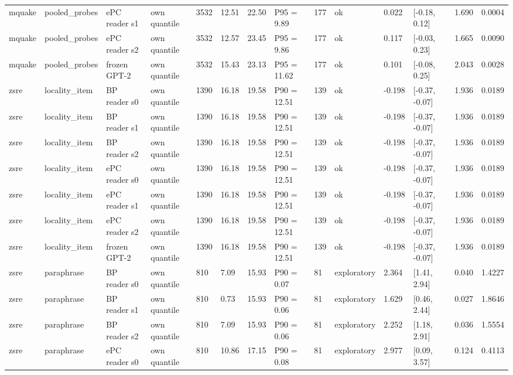 \documentclass[10pt,a4paper]{article}
\begin{document}
\begin{center}
\begin{tabularx}{\textwidth}{@{}p{}XXXXXXXXXXXXX@{}}
mquake & pooled\_probes & ePC reader s1 & own quantile & 3532 & 12.51 & 22.50 & P95 = 9.89 & 177 & ok & 0.022 & [-0.18, 0.12] & 1.690 & 0.0004 \\
mquake & pooled\_probes & ePC reader s2 & own quantile & 3532 & 12.57 & 23.45 & P95 = 9.86 & 177 & ok & 0.117 & [-0.03, 0.23] & 1.665 & 0.0090 \\
mquake & pooled\_probes & frozen GPT-2 & own quantile & 3532 & 15.43 & 23.13 & P95 = 11.62 & 177 & ok & 0.101 & [-0.08, 0.25] & 2.043 & 0.0028 \\
zsre & locality\_item & BP reader s0 & own quantile & 1390 & 16.18 & 19.58 & P90 = 12.51 & 139 & ok & -0.198 & [-0.37, -0.07] & 1.936 & 0.0189 \\
zsre & locality\_item & BP reader s1 & own quantile & 1390 & 16.18 & 19.58 & P90 = 12.51 & 139 & ok & -0.198 & [-0.37, -0.07] & 1.936 & 0.0189 \\
zsre & locality\_item & BP reader s2 & own quantile & 1390 & 16.18 & 19.58 & P90 = 12.51 & 139 & ok & -0.198 & [-0.37, -0.07] & 1.936 & 0.0189 \\
zsre & locality\_item & ePC reader s0 & own quantile & 1390 & 16.18 & 19.58 & P90 = 12.51 & 139 & ok & -0.198 & [-0.37, -0.07] & 1.936 & 0.0189 \\
zsre & locality\_item & ePC reader s1 & own quantile & 1390 & 16.18 & 19.58 & P90 = 12.51 & 139 & ok & -0.198 & [-0.37, -0.07] & 1.936 & 0.0189 \\
zsre & locality\_item & ePC reader s2 & own quantile & 1390 & 16.18 & 19.58 & P90 = 12.51 & 139 & ok & -0.198 & [-0.37, -0.07] & 1.936 & 0.0189 \\
zsre & locality\_item & frozen GPT-2 & own quantile & 1390 & 16.18 & 19.58 & P90 = 12.51 & 139 & ok & -0.198 & [-0.37, -0.07] & 1.936 & 0.0189 \\
zsre & paraphrase & BP reader s0 & own quantile & 810 & 7.09 & 15.93 & P90 = 0.07 & 81 & exploratory & 2.364 & [1.41, 2.94] & 0.040 & 1.4227 \\
zsre & paraphrase & BP reader s1 & own quantile & 810 & 0.73 & 15.93 & P90 = 0.06 & 81 & exploratory & 1.629 & [0.46, 2.44] & 0.027 & 1.8646 \\
zsre & paraphrase & BP reader s2 & own quantile & 810 & 7.09 & 15.93 & P90 = 0.06 & 81 & exploratory & 2.252 & [1.18, 2.91] & 0.036 & 1.5554 \\
zsre & paraphrase & ePC reader s0 & own quantile & 810 & 10.86 & 17.15 & P90 = 0.08 & 81 & exploratory & 2.977 & [0.09, 3.57] & 0.124 & 0.4113 \\

\end{tabularx}
\end{center}
\end{document}
